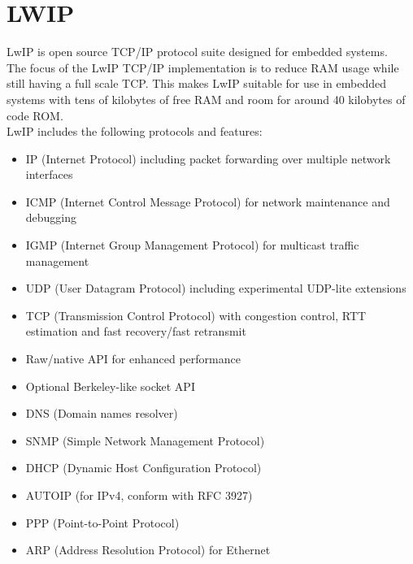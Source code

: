 \chapter{LWIP}
LwIP is open source TCP/IP protocol suite designed for embedded systems.\\
The focus of the LwIP TCP/IP implementation is to reduce RAM usage while still
having a full scale TCP. This makes LwIP
suitable for use in embedded systems with tens of kilobytes of free RAM and room
for around 40 kilobytes of code ROM.\\
LwIP includes the following protocols and features:\citep{lwip-16}\\
\begin{itemize}
	\item IP (Internet Protocol) including packet forwarding over multiple network interfaces
  \item ICMP (Internet Control Message Protocol) for network maintenance and debugging
  \item IGMP (Internet Group Management Protocol) for multicast traffic management
  \item UDP (User Datagram Protocol) including experimental UDP-lite extensions
  \item TCP (Transmission Control Protocol) with congestion control, RTT estimation and fast recovery/fast retransmit
  \item Raw/native API for enhanced performance
  \item Optional Berkeley-like socket API
  \item DNS (Domain names resolver)
  \item SNMP (Simple Network Management Protocol)
  \item DHCP (Dynamic Host Configuration Protocol)
  \item AUTOIP (for IPv4, conform with RFC 3927)
  \item PPP (Point-to-Point Protocol)
  \item ARP (Address Resolution Protocol) for Ethernet 
\end{itemize}



